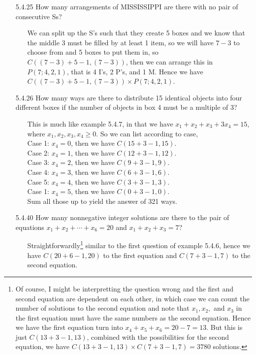 \documentclass[12pt]{article}
\begin{document}
\begin{enumerate}
\item[5.4.25] How many arrangements of MISSISSIPPI are there with no pair of consecutive Ss?
\begin{enumerate}
\item[] We can split up the S's such that they create 5 boxes and we know that the middle 3 must be filled
by at least 1 item, so we will have $7 - 3$ to choose from and 5 boxes to put them in, so $C((7 - 3) + 5 - 1, 
(7 - 3))$, then we can arrange this in $P(7; 4, 2, 1)$, that is 4 I's, 2 P's, and 1 M. Hence we have
$C((7 - 3) + 5 - 1, (7 - 3)) \times P(7; 4, 2, 1)$.
\end{enumerate}


\item[5.4.26] How many ways are there to distribute 15 identical objects into four different boxes if the number of objects in box 4 must be a multiple of 3?
\begin{enumerate}
\item[] This is much like example 5.4.7, in that we have $x_1 + x_2 + x_3 + 3x_4 = 15$, where
$x_1, x_2, x_3, x_4 \geq 0$. So we can list according to case, \\
Case 1: $x_4 = 0$, then we have $C(15 + 3 - 1, 15)$. \\
Case 2: $x_4 = 1$, then we have $C(12 + 3 - 1, 12)$. \\
Case 3: $x_4 = 2$, then we have $C(9 + 3 - 1, 9)$. \\
Case 4: $x_4 = 3$, then we have $C(6 + 3 - 1, 6)$. \\
Case 5: $x_4 = 4$, then we have $C(3 + 3 - 1, 3)$. \\
Case 1: $x_4 = 5$, then we have $C(0 + 3 - 1, 0)$. \\
Sum all those up to yield the answer of 321 ways.
\end{enumerate}

\item[5.4.40] How many nonnegative integer solutions are there to the pair of equations 
$x_1 + x_2 + \cdots + x_6 = 20$ and $x_1 + x_2 + x_3 = 7$?
\begin{enumerate}
\item[] Straightforwardly\footnote[3]{Of course, I might be interpretting the 
question wrong and the first and second equation are dependent on each other, 
in which case we can count the number of solutions to the second equation and note that
$x_1, x_2,$ and $x_3$ in the first equation must have the same numbers as the second equation. Hence
we have the first equation turn into $x_4 + x_5 + x_6 = 20 - 7 = 13$. But this is just $C(13 + 3 - 1, 13)$, 
combined with the possibilities for the second equation, we have $C(13 + 3 - 1, 13) \times C(7 + 3 - 1, 7) = 
3780$ solutions.} 
similar to the first question of example 5.4.6, hence we have $C(20 + 6 - 1, 20)$ 
to the first equation and $C(7 + 3 - 1, 7)$ to the second equation. 
\end{enumerate}


\end{enumerate}
\end{document}
